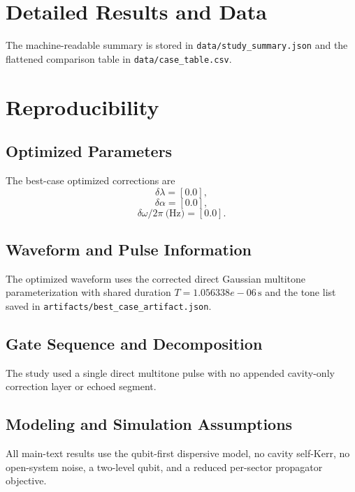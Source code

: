 \documentclass[aps,pra,twocolumn,reprint,amsmath,amssymb]{revtex4-2}
\begin{document}



\appendix
\section{Detailed Results and Data}
The machine-readable summary is stored in \texttt{data/study\_summary.json} and the flattened comparison table in \texttt{data/case\_table.csv}.

\section{Reproducibility}
\subsection{Optimized Parameters}
The best-case optimized corrections are
\begin{equation}
\delta\lambda = [0.0],
\end{equation}
\begin{equation}
\delta\alpha = [0.0],
\end{equation}
\begin{equation}
\delta\omega/2\pi\ \text{(Hz)} = [0.0].
\end{equation}

\subsection{Waveform and Pulse Information}
The optimized waveform uses the corrected direct Gaussian multitone parameterization with shared duration $T=1.056338e-06\,\mathrm{s}$ and the tone list saved in \texttt{artifacts/best\_case\_artifact.json}.

\subsection{Gate Sequence and Decomposition}
The study used a single direct multitone pulse with no appended cavity-only correction layer or echoed segment.

\subsection{Modeling and Simulation Assumptions}
All main-text results use the qubit-first dispersive model, no cavity self-Kerr, no open-system noise, a two-level qubit, and a reduced per-sector propagator objective.
\end{document}
